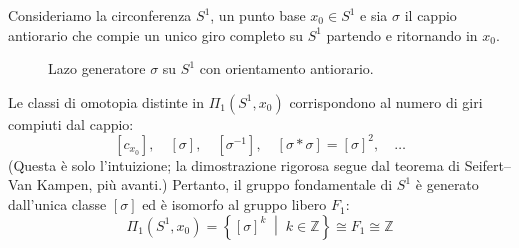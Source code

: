 \begin{ejemplo}
Consideriamo la circonferenza $S^1$, un punto base $x_0 \in S^1$ e sia $\sigma$ il cappio antiorario che compie un unico giro completo su $S^1$ partendo e ritornando in $x_0$.

\begin{figure}[H]
    \centering
    \caption{Lazo generatore $\sigma$ su $S^1$ con orientamento antiorario.}
\end{figure}

Le classi di omotopia distinte in $\Pi_1(S^1, x_0)$ corrispondono al numero di giri compiuti dal cappio:
\[
[c_{x_0}], \quad [\sigma], \quad [\sigma^{-1}], \quad [\sigma * \sigma] = [\sigma]^2, \quad \dots
\]
(Questa \`e solo l'intuizione; la dimostrazione rigorosa segue dal teorema di Seifert--Van Kampen, pi\`u avanti.) Pertanto, il gruppo fondamentale di $S^1$ è generato dall'unica classe $[\sigma]$ ed è isomorfo al gruppo libero $F_1$:
\[
\Pi_1(S^1, x_0) = \left\{ [\sigma]^k \;\middle|\; k \in \mathbb{Z} \right\} \cong F_1 \cong \mathbb{Z}
\]
\end{ejemplo}

